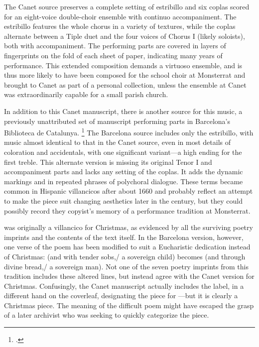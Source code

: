 The Canet source preserves a complete setting of estribillo and six coplas
scored for an eight-voice double-choir ensemble with continuo accompaniment.
The estribillo features the whole chorus in a variety of textures, while the
coplas alternate between a Tiple duet and the four voices of Chorus I (likely
soloists), both with accompaniment.
The performing parts are covered in layers of fingerprints on the fold of each
sheet of paper, indicating many years of performance.
This extended composition demands a virtuoso ensemble, and is thus more likely
to have been composed for the school choir at Monsterrat and brought to Canet as
part of a personal collection, unless the ensemble at Canet was extraordinarily
capable for a small parish church.

In addition to this Canet manuscript, there is another source for this music, a
previously unattributed set of manuscript performing parts in Barcelona's
Biblioteca de Catalunya.%
    \footnote{.}
The Barcelona source includes only the estribillo, with music almost identical
to that in the Canet source, even in most details of coloration and accidentals,
with one significant variant---a  high ending for the first treble.
This alternate version is missing its original Tenor I and accompaniment parts
and lacks any setting of the coplas.
It adds the dynamic markings  and  in repeated phrases
of polychoral dialogue. 
These terms became common in Hispanic villancicos after about 1660 and probably
reflect an attempt to make the piece suit changing aesthetics later in the
century, but they could possibly record they copyist's memory of a performance
tradition at Monsterrat.%

 was originally a villancico for Christmas, as
evidenced by all the surviving poetry imprints and the contents of the text
itself.
In the Barcelona version, however, one verse of the poem has been modified to
suit a Eucharistic dedication instead of Christmas:  (and with tender sobs,/ a sovereign child) becomes
 (and through divine bread,/
a sovereign man).
Not one of the seven poetry imprints from this tradition includes these altered
lines, but instead agree with the Canet version for Christmas.
Confusingly, the Canet manuscript actually includes the label, in a different
hand on the coverleaf, designating the piece for ---but it is clearly a Christmas piece.
The meaning of the difficult poem might have escaped the grasp of a later
archivist who was seeking to quickly categorize the piece.

